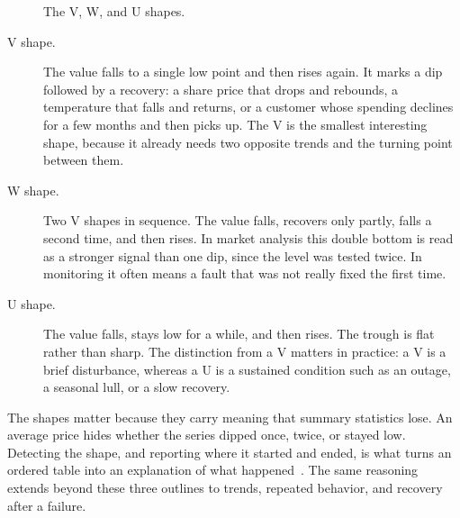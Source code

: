\begin{figure}[htbp]
{
  }
  \caption{The V, W, and U shapes.}
  \label{fig:intro-shapes}
\end{figure}

\begin{description}
  \item[V shape.] The value falls to a single low point and then rises
    again.  It marks a dip followed by a recovery: a share price that drops
    and rebounds, a temperature that falls and returns, or a customer whose
    spending declines for a few months and then picks up.  The V is the
    smallest interesting shape, because it already needs two opposite
    trends and the turning point between them.

  \item[W shape.] Two V shapes in sequence.  The value falls, recovers only
    partly, falls a second time, and then rises.  In market analysis this
    double bottom is read as a stronger signal than one dip, since the
    level was tested twice.  In monitoring it often means a fault that was
    not really fixed the first time.

  \item[U shape.] The value falls, stays low for a while, and then rises.
    The trough is flat rather than sharp.  The distinction from a V matters
    in practice: a V is a brief disturbance, whereas a U is a sustained
    condition such as an outage, a seasonal lull, or a slow recovery.
\end{description}

The shapes matter because they carry meaning that summary statistics lose.
An average price hides whether the series dipped once, twice, or stayed
low.  Detecting the shape, and reporting where it started and ended, is
what turns an ordered table into an explanation of what
happened~\cite{petkovic2022rpr}.  The same reasoning extends beyond these
three outlines to trends, repeated behavior, and recovery after a failure.

